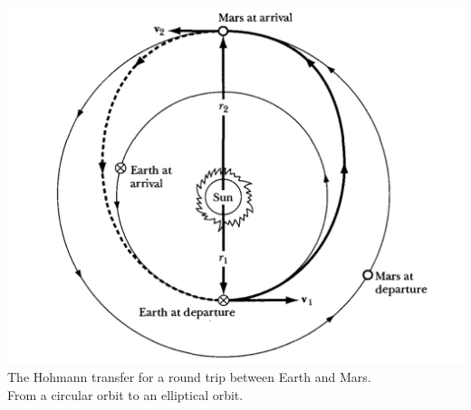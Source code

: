 \documentclass[11pt,oneside]{book}
\theoremstyle{break}
\theoremstyle{break}
\begin{document}
\begin{center}
\includegraphics[scale=0.48]{OrbitalDynamics.png}\\
The Hohmann transfer for a round trip between Earth and Mars. \\
From a circular orbit to an elliptical orbit.
\end{center}
\hfill\break
\end{document}
